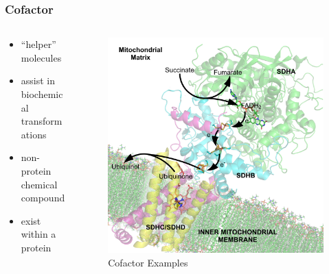 \documentclass[10pt]{beamer}
\begin{document}
\begin{frame}
	\frametitle{Cofactor}

	\begin{columns}[T]
		\begin{column}{.5\textwidth}
			\begin{itemize}
				\item ``helper'' molecules
				\item assist in biochemical transformations
				\item non-protein chemical compound
				\item exist within a protein
			\end{itemize}
		\end{column}
		\begin{column}{.5\textwidth}
			\begin{figure}
				\caption{Cofactor Examples}
				\includegraphics[width=1.0\textwidth,natwidth=1630,natheight=1620]{img/Succinate_Dehydrogenase_1YQ3_Electron_Carriers_Labeled.png}
			\end{figure}
		\end{column}
	\end{columns}
	
\end{frame}
\end{document}
